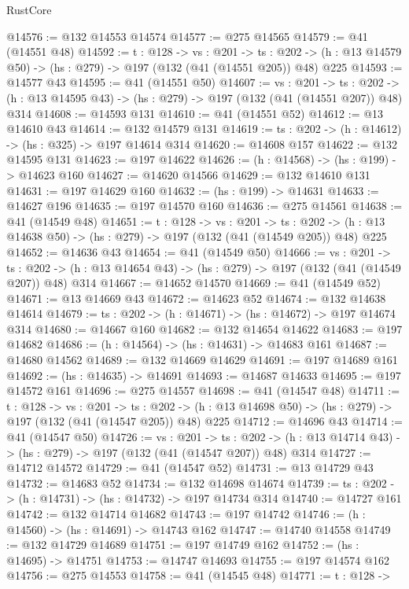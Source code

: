 \begin{lexlean}{RustCore}
\begin{coremodule}
@14576 := @132 @14553 @14574
@14577 := @275 @14565
@14579 := @41 (@14551 @48)
@14592 := {t : @128} ->
  {vs : @201} ->
  {ts : @202} -> (h : @13 @14579 @50) -> (hs : @279) -> @197 (@132 (@41 (@14551 @205)) @48) @225
@14593 := @14577 @43
@14595 := @41 (@14551 @50)
@14607 := {vs : @201} ->
  {ts : @202} -> (h : @13 @14595 @43) -> (hs : @279) -> @197 (@132 (@41 (@14551 @207)) @48) @314
@14608 := @14593 @131
@14610 := @41 (@14551 @52)
@14612 := @13 @14610 @43
@14614 := @132 @14579 @131
@14619 := {ts : @202} -> (h : @14612) -> (hs : @325) -> @197 @14614 @314
@14620 := @14608 @157
@14622 := @132 @14595 @131
@14623 := @197 @14622
@14626 := (h : @14568) -> (hs : @199) -> @14623 @160
@14627 := @14620 @14566
@14629 := @132 @14610 @131
@14631 := @197 @14629 @160
@14632 := (hs : @199) -> @14631
@14633 := @14627 @196
@14635 := @197 @14570 @160
@14636 := @275 @14561
@14638 := @41 (@14549 @48)
@14651 := {t : @128} ->
  {vs : @201} ->
  {ts : @202} -> (h : @13 @14638 @50) -> (hs : @279) -> @197 (@132 (@41 (@14549 @205)) @48) @225
@14652 := @14636 @43
@14654 := @41 (@14549 @50)
@14666 := {vs : @201} ->
  {ts : @202} -> (h : @13 @14654 @43) -> (hs : @279) -> @197 (@132 (@41 (@14549 @207)) @48) @314
@14667 := @14652 @14570
@14669 := @41 (@14549 @52)
@14671 := @13 @14669 @43
@14672 := @14623 @52
@14674 := @132 @14638 @14614
@14679 := {ts : @202} -> (h : @14671) -> (hs : @14672) -> @197 @14674 @314
@14680 := @14667 @160
@14682 := @132 @14654 @14622
@14683 := @197 @14682
@14686 := (h : @14564) -> (hs : @14631) -> @14683 @161
@14687 := @14680 @14562
@14689 := @132 @14669 @14629
@14691 := @197 @14689 @161
@14692 := (hs : @14635) -> @14691
@14693 := @14687 @14633
@14695 := @197 @14572 @161
@14696 := @275 @14557
@14698 := @41 (@14547 @48)
@14711 := {t : @128} ->
  {vs : @201} ->
  {ts : @202} -> (h : @13 @14698 @50) -> (hs : @279) -> @197 (@132 (@41 (@14547 @205)) @48) @225
@14712 := @14696 @43
@14714 := @41 (@14547 @50)
@14726 := {vs : @201} ->
  {ts : @202} -> (h : @13 @14714 @43) -> (hs : @279) -> @197 (@132 (@41 (@14547 @207)) @48) @314
@14727 := @14712 @14572
@14729 := @41 (@14547 @52)
@14731 := @13 @14729 @43
@14732 := @14683 @52
@14734 := @132 @14698 @14674
@14739 := {ts : @202} -> (h : @14731) -> (hs : @14732) -> @197 @14734 @314
@14740 := @14727 @161
@14742 := @132 @14714 @14682
@14743 := @197 @14742
@14746 := (h : @14560) -> (hs : @14691) -> @14743 @162
@14747 := @14740 @14558
@14749 := @132 @14729 @14689
@14751 := @197 @14749 @162
@14752 := (hs : @14695) -> @14751
@14753 := @14747 @14693
@14755 := @197 @14574 @162
@14756 := @275 @14553
@14758 := @41 (@14545 @48)
@14771 := {t : @128} ->

\end{coremodule}
\end{lexlean}
